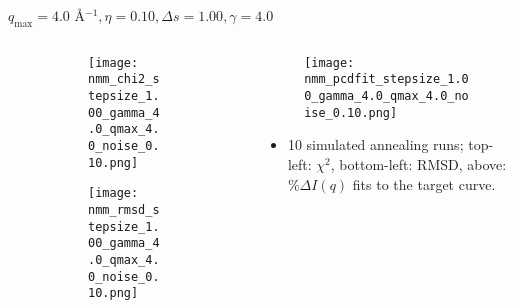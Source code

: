 \documentclass{beamer}
\begin{document}
\begin{frame}{$ q_{\textrm{max}}=4.0 $ \AA $^{-1}, \eta=0.10, \Delta s=1.00, \gamma=4.0$}
	\begin{columns}
		\begin{column}{.5\textwidth}
			\begin{figure}[H]
			\centering
			\begin{subfigure}[b]{\textwidth}
				\centering
				\texttt{[image: nmm\_chi2\_stepsize\_1.00\_gamma\_4.0\_qmax\_4.0\_noise\_0.10.png]}
				\label{fig:}
			\end{subfigure}
			\begin{subfigure}[b]{\textwidth}
				\centering
				\texttt{[image: nmm\_rmsd\_stepsize\_1.00\_gamma\_4.0\_qmax\_4.0\_noise\_0.10.png]}
				\label{fig:}
			\end{subfigure}
			\end{figure}
		\end{column}
		\begin{column}{.5\textwidth}
			\begin{figure}[H]
				\centering
				\texttt{[image: nmm\_pcdfit\_stepsize\_1.00\_gamma\_4.0\_qmax\_4.0\_noise\_0.10.png]}
				\label{fig:}
			\end{figure}
			\begin{itemize}
				\item 10 simulated annealing runs; top-left: $\chi^2$, bottom-left: RMSD, above: $\%\Delta I(q)$ fits to the target curve.
			\end{itemize}
		\end{column}
	\end{columns}
\end{frame}
 
\end{document}
